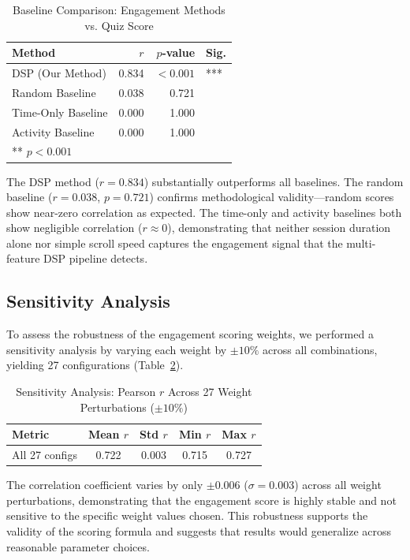 \documentclass[conference]{IEEEtran}
\begin{document}
\begin{table}[htbp]
\caption{Baseline Comparison: Engagement Methods vs. Quiz Score}
\label{tab:baseline}
\centering
\begin{tabular}{lrrl}
\toprule
\textbf{Method} & \textbf{$r$} & \textbf{$p$-value} & \textbf{Sig.} \\
\midrule
DSP (Our Method)    & 0.834 & $< 0.001$ & *** \\
Random Baseline     & 0.038 & 0.721     &     \\
Time-Only Baseline  & 0.000 & 1.000     &     \\
Activity Baseline   & 0.000 & 1.000     &     \\
\bottomrule
\multicolumn{4}{l}{\small *** $p < 0.001$}
\end{tabular}
\end{table}

The DSP method ($r = 0.834$) substantially outperforms all baselines. The random baseline ($r = 0.038$, $p = 0.721$) confirms methodological validity---random scores show near-zero correlation as expected. The time-only and activity baselines both show negligible correlation ($r \approx 0$), demonstrating that neither session duration alone nor simple scroll speed captures the engagement signal that the multi-feature DSP pipeline detects.

\subsection{Sensitivity Analysis}

To assess the robustness of the engagement scoring weights, we performed a sensitivity analysis by varying each weight by $\pm 10\%$ across all combinations, yielding 27 configurations (Table~\ref{tab:sensitivity}).

\begin{table}[htbp]
\caption{Sensitivity Analysis: Pearson $r$ Across 27 Weight Perturbations ($\pm 10\%$)}
\label{tab:sensitivity}
\centering
\begin{tabular}{lcccc}
\toprule
\textbf{Metric} & \textbf{Mean $r$} & \textbf{Std $r$} & \textbf{Min $r$} & \textbf{Max $r$} \\
\midrule
All 27 configs & 0.722 & 0.003 & 0.715 & 0.727 \\
\bottomrule
\end{tabular}
\end{table}

The correlation coefficient varies by only $\pm 0.006$ ($\sigma = 0.003$) across all weight perturbations, demonstrating that the engagement score is highly stable and not sensitive to the specific weight values chosen. This robustness supports the validity of the scoring formula and suggests that results would generalize across reasonable parameter choices.
\end{document}
